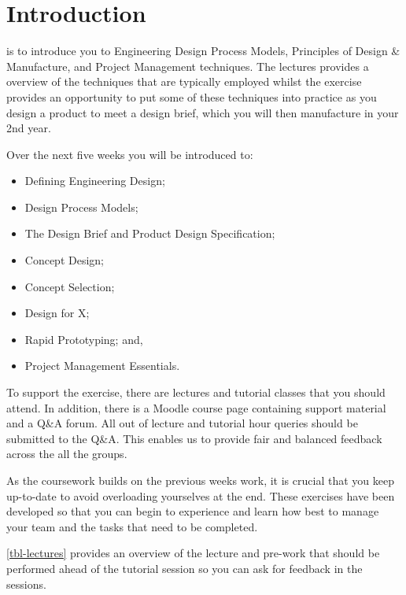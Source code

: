 \section{Introduction}

 is to introduce you to Engineering Design Process Models, Principles of Design \& Manufacture, and Project Management techniques. 
The lectures provides a overview of the techniques that are typically employed whilst the exercise provides an opportunity to put some of these techniques into practice as you design a product to meet a design brief, which you will then manufacture in your 2nd year.

Over the next five weeks you will be introduced to:

\begin{itemize}
  \item Defining Engineering Design;
  \item Design Process Models;
  \item The Design Brief and Product Design Specification;
  \item Concept Design;
  \item Concept Selection;
  \item Design for X;
  \item Rapid Prototyping; and,
  \item Project Management Essentials.
\end{itemize}

To support the exercise, there are lectures and tutorial classes that you should attend. 
In addition, there is a Moodle course page containing support material and a Q\&A forum. 
All out of lecture and tutorial hour queries should be submitted to the Q\&A. 
This enables us to provide fair and balanced feedback across the all the groups.

As the coursework builds on the previous weeks work, it is crucial that you keep up-to-date to avoid overloading yourselves at the end. These exercises have been developed so that you can begin to experience and learn how best to manage your team and the tasks that need to be completed.

\cref{tbl-lectures} provides an overview of the lecture and pre-work that should be performed ahead of the tutorial session so you can ask for feedback in the sessions.

